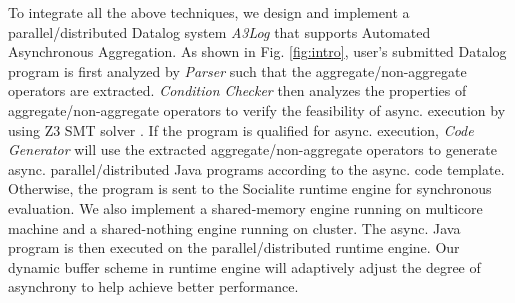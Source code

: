 To integrate all the above techniques, we design and implement a parallel/distributed Datalog system \emph{A3Log} that supports Automated Asynchronous Aggregation. As shown in Fig. \ref{fig:intro}, user's submitted Datalog program is first analyzed by \textit{Parser} such that the aggregate/non-aggregate operators are extracted. \textit{Condition Checker} then analyzes the properties of aggregate/non-aggregate operators to verify the feasibility of async. execution by using Z3 SMT solver \cite{}. If the program is qualified for async. execution, \textit{Code Generator} will use the extracted aggregate/non-aggregate operators to generate async. parallel/distributed Java programs according to the async. code template. Otherwise, the program is sent to the Socialite runtime engine for synchronous evaluation. We also implement a shared-memory engine running on multicore machine and a shared-nothing engine running on cluster. The async. Java program is then executed on the parallel/distributed runtime engine. Our dynamic buffer scheme in runtime engine will adaptively adjust the degree of asynchrony to help achieve better performance.


